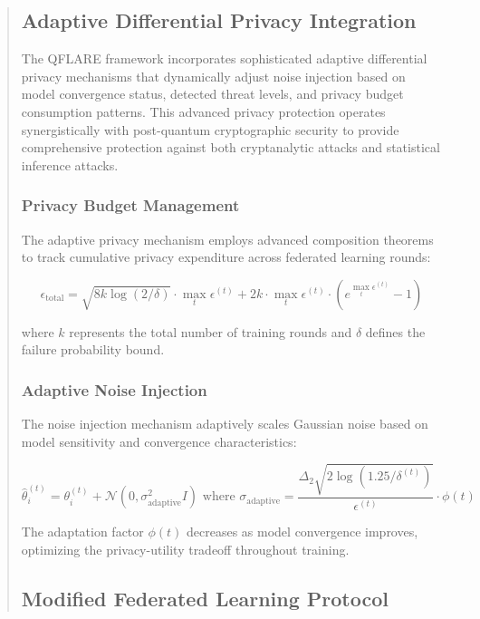 \documentclass{svproc}
\begin{document}
\begin{abstract}
\subsection{Adaptive Differential Privacy Integration}

The QFLARE framework incorporates sophisticated adaptive differential privacy mechanisms that dynamically adjust noise injection based on model convergence status, detected threat levels, and privacy budget consumption patterns. This advanced privacy protection operates synergistically with post-quantum cryptographic security to provide comprehensive protection against both cryptanalytic attacks and statistical inference attacks.

\subsubsection{Privacy Budget Management}

The adaptive privacy mechanism employs advanced composition theorems to track cumulative privacy expenditure across federated learning rounds:

\begin{equation}
\epsilon_{\text{total}} = \sqrt{8k \log(2/\delta)} \cdot \max_t \epsilon^{(t)} + 2k \cdot \max_t \epsilon^{(t)} \cdot (e^{\max_t \epsilon^{(t)}} - 1)
\end{equation}

where $k$ represents the total number of training rounds and $\delta$ defines the failure probability bound.

\subsubsection{Adaptive Noise Injection}

The noise injection mechanism adaptively scales Gaussian noise based on model sensitivity and convergence characteristics:

\begin{equation}
\hat{\theta}_i^{(t)} = \theta_i^{(t)} + \mathcal{N}(0, \sigma_{\text{adaptive}}^2 I) \text{ where } \sigma_{\text{adaptive}} = \frac{\Delta_2 \sqrt{2\log(1.25/\delta^{(t)})}}{\epsilon^{(t)}} \cdot \phi(t)
\end{equation}

The adaptation factor $\phi(t)$ decreases as model convergence improves, optimizing the privacy-utility tradeoff throughout training.

\subsection{Modified Federated Learning Protocol}


\end{abstract}
\end{document}
